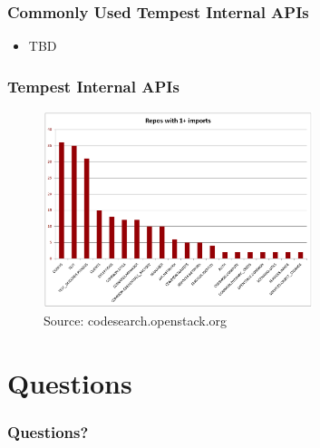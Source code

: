 \documentclass[aspectratio=169,11pt,hyperref={colorlinks=true}]{beamer}
\begin{document}
\begin{frame}
    \frametitle{Commonly Used Tempest Internal APIs}
    \begin{itemize}
        \item{TBD}
    \end{itemize}
\end{frame}

\begin{frame}
    \frametitle{Tempest Internal APIs}
    \begin{figure}[p]
    	\centering
    	\includegraphics[width=0.7\textwidth]{tempest-imports.png}
    	\caption{Source: codesearch.openstack.org}
    \end{figure}
\end{frame}


\section{Questions}
\begin{frame}
\frametitle{Questions?}
\end{frame}

\end{document}
